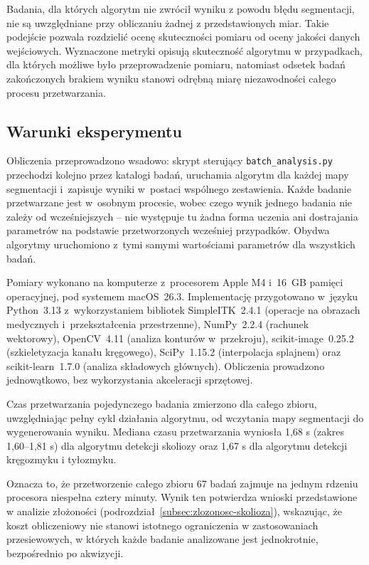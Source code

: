 Badania, dla których algorytm nie zwrócił wyniku z powodu błędu segmentacji, nie są uwzględniane przy obliczaniu żadnej z przedstawionych miar. Takie podejście pozwala rozdzielić ocenę skuteczności pomiaru od oceny jakości danych wejściowych. Wyznaczone metryki opisują skuteczność algorytmu w przypadkach, dla których możliwe było przeprowadzenie pomiaru, natomiast odsetek badań zakończonych brakiem wyniku stanowi odrębną miarę niezawodności całego procesu przetwarzania.

\subsection{Warunki eksperymentu}
\label{subsec:warunki}

Obliczenia przeprowadzono wsadowo: skrypt sterujący \texttt{batch\_analysis.py} przechodzi kolejno przez katalogi badań, uruchamia algorytm dla każdej mapy segmentacji i~zapisuje wyniki w~postaci wspólnego zestawienia.
Każde badanie przetwarzane jest w~osobnym procesie, wobec czego wynik jednego badania nie zależy od wcześniejszych -- nie występuje tu żadna forma uczenia ani dostrajania parametrów na podstawie przetworzonych wcześniej przypadków.
Obydwa algorytmy uruchomiono z~tymi samymi wartościami parametrów dla wszystkich badań.

Pomiary wykonano na komputerze z~procesorem Apple M4 i~16~GB pamięci operacyjnej, pod systemem macOS~26.3.
Implementację przygotowano w~języku Python~3.13 z~wykorzystaniem bibliotek SimpleITK~2.4.1 (operacje na obrazach medycznych i~przekształcenia przestrzenne), NumPy~2.2.4 (rachunek wektorowy), OpenCV~4.11 (analiza konturów w~przekroju), scikit-image~0.25.2 (szkieletyzacja kanału kręgowego), SciPy~1.15.2 (interpolacja splajnem) oraz scikit-learn~1.7.0 (analiza składowych głównych).
Obliczenia prowadzono jednowątkowo, bez wykorzystania akceleracji sprzętowej.

Czas przetwarzania pojedynczego badania zmierzono dla całego zbioru, uwzględniając pełny cykl działania algorytmu, od wczytania mapy segmentacji do wygenerowania wyniku.
Mediana czasu przetwarzania wyniosła 1,68 s (zakres 1,60--1,81 s) dla algorytmu detekcji skoliozy oraz 1,67 s dla algorytmu detekcji kręgozmyku i tyłozmyku.

Oznacza to, że przetworzenie całego zbioru 67 badań zajmuje na jednym rdzeniu procesora niespełna cztery minuty. Wynik ten potwierdza wnioski przedstawione w analizie złożoności (podrozdział~\ref{subsec:zlozonosc-skolioza}), wskazując, że koszt obliczeniowy nie stanowi istotnego ograniczenia w zastosowaniach przesiewowych, w których każde badanie analizowane jest jednokrotnie, bezpośrednio po akwizycji.



